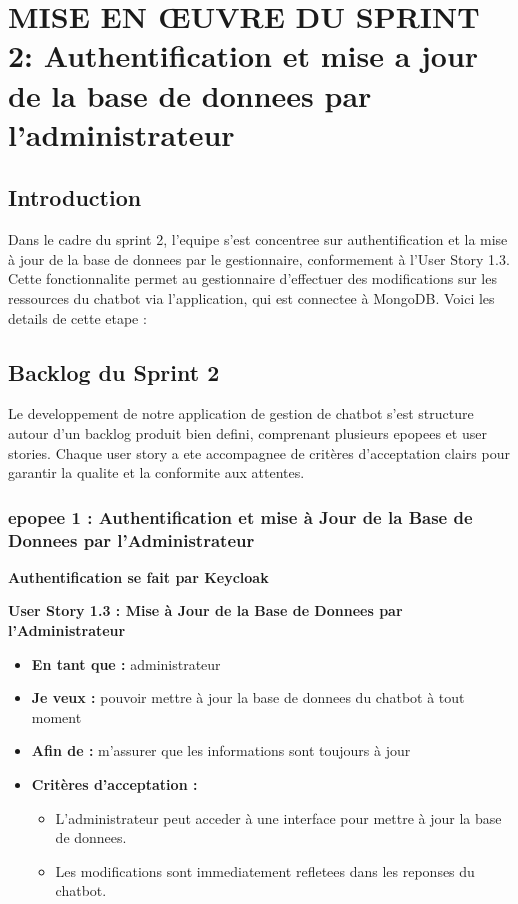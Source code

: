\documentclass[a4paper, 11pt, openany]{report}
\begin{document}
\chapter{MISE EN ŒUVRE DU SPRINT 2: Authentification et mise a jour de la base de donnees par l’administrateur}
\section{Introduction}

Dans le cadre du sprint 2, l'equipe s'est concentree sur authentification et la mise à jour de la base de donnees par le gestionnaire, conformement à l'User Story 1.3. Cette fonctionnalite permet au gestionnaire d'effectuer des modifications sur les ressources du chatbot via l'application, qui est connectee à MongoDB. Voici les details de cette etape :

\section{Backlog du Sprint 2}

Le developpement de notre application de gestion de chatbot s’est structure autour d’un backlog produit bien defini, comprenant plusieurs epopees et user stories. Chaque user story a ete accompagnee de critères d’acceptation clairs pour garantir la qualite et la conformite aux attentes.

\subsection{epopee 1 : Authentification et mise à Jour de la Base de Donnees par l’Administrateur}

\textbf{Authentification se fait par Keycloak}

\textbf{User Story 1.3 : Mise à Jour de la Base de Donnees par l’Administrateur}
\begin{itemize}
    \item \textbf{En tant que :} administrateur
    \item \textbf{Je veux :} pouvoir mettre à jour la base de donnees du chatbot à tout moment
    \item \textbf{Afin de :} m’assurer que les informations sont toujours à jour
    \item \textbf{Critères d'acceptation :}
    \begin{itemize}
        \item L’administrateur peut acceder à une interface pour mettre à jour la base de donnees.
        \item Les modifications sont immediatement refletees dans les reponses du chatbot.
    \end{itemize}
\end{itemize}
\end{document}
